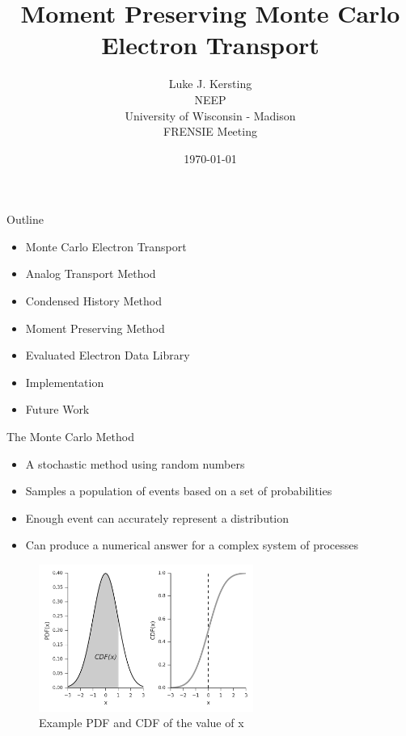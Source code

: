 \documentclass{beamer}
\author{Luke J. Kersting
    \\ NEEP
    \\ University of Wisconsin - Madison
    \\ FRENSIE Meeting
}
\date{\today}
\title{Moment Preserving Monte Carlo Electron Transport}
\begin{document}
\maketitle

\begin{frame}{Outline}

    \begin{itemize}
      \item Monte Carlo Electron Transport
      \item Analog Transport Method
      \item Condensed History Method
      \item Moment Preserving Method
      \item Evaluated Electron Data Library
      \item Implementation
      \item Future Work
    \end{itemize}

\end{frame}

\begin{frame}{The Monte Carlo Method}

    \begin{itemize}
      \item A stochastic method using random numbers
      \item Samples a population of events based on a set of probabilities
      \item Enough event can accurately represent a distribution
      \item Can produce a numerical answer for a complex system of processes
    \end{itemize}
    
    \begin{figure}
  \centering
  \includegraphics[width=70mm]{PDF_CDF.png}
  \caption{Example PDF and CDF of the value of x}
\end{figure}

\end{frame}
\end{document}
